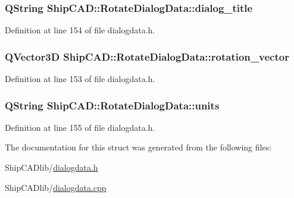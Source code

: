 \subsubsection[{\texorpdfstring{dialog\+\_\+title}{dialog_title}}]{\setlength{\rightskip}{0pt plus 5cm}Q\+String Ship\+C\+A\+D\+::\+Rotate\+Dialog\+Data\+::dialog\+\_\+title}\hypertarget{structShipCAD_1_1RotateDialogData_af8648790d9c834ad4c65e3a188290738}{}\label{structShipCAD_1_1RotateDialogData_af8648790d9c834ad4c65e3a188290738}


Definition at line 154 of file dialogdata.\+h.

\subsubsection[{\texorpdfstring{rotation\+\_\+vector}{rotation_vector}}]{\setlength{\rightskip}{0pt plus 5cm}Q\+Vector3D Ship\+C\+A\+D\+::\+Rotate\+Dialog\+Data\+::rotation\+\_\+vector}\hypertarget{structShipCAD_1_1RotateDialogData_a53bd3533c7fd9e82d9298cbba080a430}{}\label{structShipCAD_1_1RotateDialogData_a53bd3533c7fd9e82d9298cbba080a430}


Definition at line 153 of file dialogdata.\+h.

\subsubsection[{\texorpdfstring{units}{units}}]{\setlength{\rightskip}{0pt plus 5cm}Q\+String Ship\+C\+A\+D\+::\+Rotate\+Dialog\+Data\+::units}\hypertarget{structShipCAD_1_1RotateDialogData_a893de613d61c0c377dbbd1cee8cb6c19}{}\label{structShipCAD_1_1RotateDialogData_a893de613d61c0c377dbbd1cee8cb6c19}


Definition at line 155 of file dialogdata.\+h.



The documentation for this struct was generated from the following files\+:\begin{DoxyCompactItemize}
\item 
Ship\+C\+A\+Dlib/\hyperlink{dialogdata_8h}{dialogdata.\+h}\item 
Ship\+C\+A\+Dlib/\hyperlink{dialogdata_8cpp}{dialogdata.\+cpp}\end{DoxyCompactItemize}
